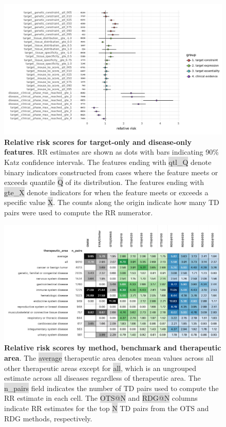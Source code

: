 \documentclass{article}
\begin{document}
\begin{figure}[H]
  \centering
  \captionsetup{width=.9\linewidth}
  \includegraphics[width=1\textwidth]{relative_risk_static_features.pdf}
  \caption{
    \textbf{Relative risk scores for target-only and disease-only features}.
    RR estimates are shown as dots with bars indicating 90\% Katz confidence intervals.
    The features ending with \colorbox{Gainsboro}{qtl\_Q} denote binary indicators constructed from cases where the feature meets or exceeds quantile \colorbox{Gainsboro}{Q} of its distribution. The features ending with \colorbox{Gainsboro}{gte\_X} denote indicators for when the feature meets or exceeds a specific value \colorbox{Gainsboro}{X}. The counts along the origin indicate how many TD pairs were used to compute the RR numerator.
  }
  \label{fig:relative_risk_static_features}
\end{figure}

\pagebreak

\begin{figure}[H]
  \centering
  \captionsetup{width=.9\linewidth}
  \includegraphics[width=1\textwidth]{relative_risk_by_ta.png}
  \caption{
    \textbf{Relative risk scores by method, benchmark and therapeutic area}.
    The \colorbox{Gainsboro}{average} therapeutic area denotes mean values across all other therapeutic areas except for \colorbox{Gainsboro}{all}, which is an ungrouped estimate across all diseases regardless of therapeutic area. The \colorbox{Gainsboro}{n\_pairs} field indicates the number of TD pairs used to compute the RR estimate in each cell. The \colorbox{Gainsboro}{OTS@N} and \colorbox{Gainsboro}{RDG@N} columns indicate RR estimates for the top \colorbox{Gainsboro}{N} TD pairs from the OTS and RDG methods, respectively.
  }
  \label{fig:relative_risk_by_ta}
\end{figure}
  
\end{document}
